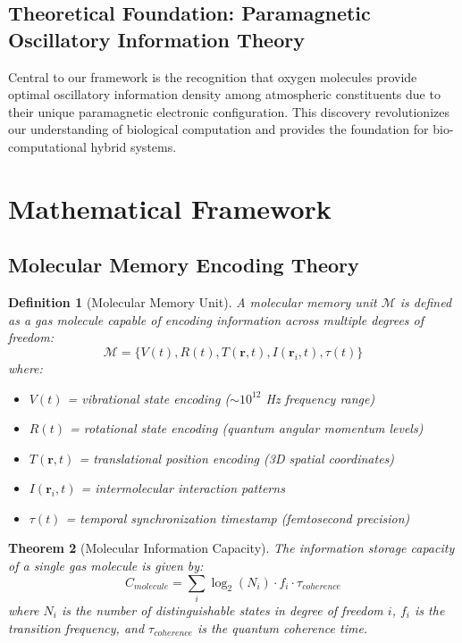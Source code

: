 \documentclass[12pt]{article}
\newtheorem{theorem}{Theorem}[section]
\newtheorem{definition}[theorem]{Definition}
\begin{document}
\subsection{Theoretical Foundation: Paramagnetic Oscillatory Information Theory}

Central to our framework is the recognition that oxygen molecules provide optimal oscillatory information density among atmospheric constituents due to their unique paramagnetic electronic configuration. This discovery revolutionizes our understanding of biological computation and provides the foundation for bio-computational hybrid systems.

\section{Mathematical Framework}

\subsection{Molecular Memory Encoding Theory}

\begin{definition}[Molecular Memory Unit]
A molecular memory unit $\mathcal{M}$ is defined as a gas molecule capable of encoding information across multiple degrees of freedom:
\begin{equation}
\mathcal{M} = \{V(t), R(t), T(\mathbf{r},t), I(\mathbf{r}_i, t), \tau(t)\}
\end{equation}
where:
\begin{itemize}
\item $V(t)$ = vibrational state encoding ($\sim 10^{12}$ Hz frequency range)
\item $R(t)$ = rotational state encoding (quantum angular momentum levels)
\item $T(\mathbf{r},t)$ = translational position encoding (3D spatial coordinates)
\item $I(\mathbf{r}_i, t)$ = intermolecular interaction patterns
\item $\tau(t)$ = temporal synchronization timestamp (femtosecond precision)
\end{itemize}
\end{definition}

\begin{theorem}[Molecular Information Capacity]
The information storage capacity of a single gas molecule is given by:
\begin{equation}
C_{molecule} = \sum_{i} \log_2(N_i) \cdot f_i \cdot \tau_{coherence}
\end{equation}
where $N_i$ is the number of distinguishable states in degree of freedom $i$, $f_i$ is the transition frequency, and $\tau_{coherence}$ is the quantum coherence time.
\end{theorem}
\end{document}
